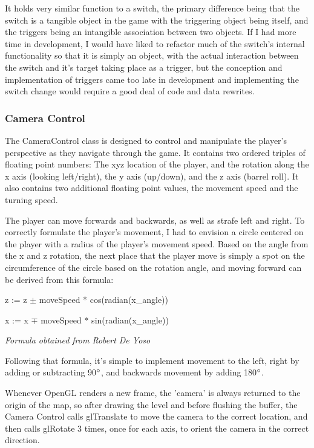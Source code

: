 \documentclass{article}
\begin{document}
It holds very similar function to a switch, the primary difference being that the switch is a tangible object in the game with the triggering object being itself, and the triggers being an intangible association between two objects. If I had more time in development, I would have liked to refactor much of the switch's internal functionality so that it is simply an object, with the actual interaction between the switch and it's target taking place as a trigger, but the conception and implementation of triggers came too late in development and implementing the switch change would require a good deal of code and data rewrites.

\subsubsection{Camera Control}
The CameraControl class is designed to control and manipulate the player's perspective as they navigate through the game. It contains two ordered triples of floating point numbers: The xyz location of the player, and the rotation along the x axis (looking left/right), the y axis (up/down), and the z axis (barrel roll). It also contains two additional floating point values, the movement speed and the turning speed. 

The player can move forwards and backwards, as well as strafe left and right. To correctly formulate the player's movement, I had to envision a circle centered on the player with a radius of the player's movement speed. Based on the angle from the x and z rotation, the next place that the player move is simply a spot on the circumference of the circle based on the rotation angle, and moving forward can be derived from this formula:

z := z $\pm$ moveSpeed * cos(radian(x\_angle))

x := x $\mp$ moveSpeed * sin(radian(x\_angle))

\emph{\tiny{Formula obtained from Robert De Yoso}}

\small{}

Following that formula, it's simple to implement movement to the left, right by adding or subtracting 90$\degree$, and backwards movement by adding 180$\degree$.

Whenever OpenGL renders a new frame, the 'camera' is always returned to the origin of the map, so after drawing the level and before flushing the buffer, the Camera Control calls glTranslate to move the camera to the correct location, and then calls glRotate 3 times, once for each axis, to orient the camera in the correct direction.
\end{document}
